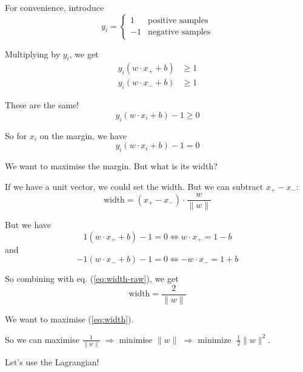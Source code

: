 For convenience, introduce
\begin{equation*}
  y_i =
  \begin{cases}
    1 & \mbox{positive samples} \\
    -1 & \mbox{negative samples}
  \end{cases}
\end{equation*}

Multiplying by $y_i$, we get
\begin{align*}
  y_i(w\cdot x_+ + b) & \ge 1
  \\
  y_i(w\cdot x_- + b) & \ge 1
\end{align*}

These are the same!
\begin{displaymath}
  y_i(w\cdot x_i + b) - 1 \ge 0
\end{displaymath}

So for $x_i$ on the margin, we have
\begin{equation}
  \label{eq:on-margin}
  \boxed{y_i(w\cdot x_i + b) - 1 = 0}
\end{equation}

We want to maximise the margin.  But what is its width?

If we have a unit vector, we could set the width.  But we can subtract $x_+-x_-$:
\begin{equation}
  \label{eq:width-raw}
  \mbox{width} = (x_+ - x_-) \cdot \frac{w}{\parallel w\parallel}
\end{equation}

But we have
\begin{displaymath}
  1(w\cdot x_+ + b) - 1 = 0 \iff w\cdot x_+ = 1-b
\end{displaymath}
and
\begin{displaymath}
  -1(w\cdot x_- + b) - 1 = 0 \iff -w\cdot x_- = 1+b
\end{displaymath}

So combining with eq. (\ref{eq:width-raw}), we get
\begin{equation}
  \label{eq:width}
  \mbox{width} = \frac{2}{\parallel w\parallel}
\end{equation}

We want to maximise (\ref{eq:width}).

So we can maximise $\frac{1}{\parallel w\parallel}$ $\Rightarrow$
minimise $\parallel w\parallel$ $\Rightarrow$
minimize $\;\frac 12 \parallel w\parallel^2$.

\bigskip

Let's use the Lagrangian!

